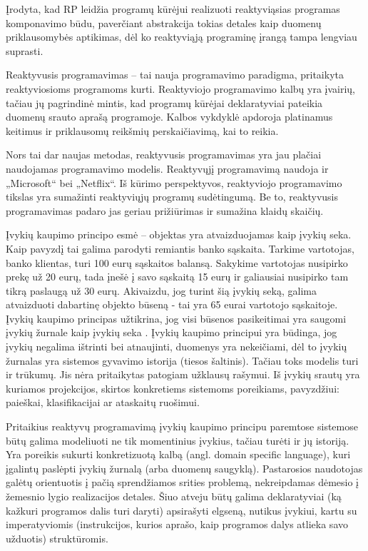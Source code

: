 Įrodyta, kad RP leidžia programų kūrėjui realizuoti reaktyviąsias programas komponavimo būdu, paverčiant abstrakcija tokias detales kaip duomenų priklausomybės aptikimas, dėl ko reaktyviąją programinę įrangą tampa lengviau suprasti.

Reaktyvusis programavimas – tai nauja programavimo paradigma, pritaikyta reaktyviosioms programoms kurti. Reaktyviojo programavimo kalbų yra įvairių, tačiau jų pagrindinė mintis, kad programų kūrėjai deklaratyviai pateikia duomenų srauto aprašą programoje. Kalbos vykdyklė apdoroja platinamus keitimus ir priklausomų reikšmių perskaičiavimą, kai to reikia.

Nors tai dar naujas metodas, reaktyvusis programavimas yra jau plačiai naudojamas programavimo modelis. Reaktyvųjį programavimą naudoja ir „Microsoft“ bei „Netflix“. Iš kūrimo perspektyvos, reaktyviojo programavimo tikslas yra sumažinti reaktyviųjų programų sudėtingumą. Be to, reaktyvusis programavimas padaro jas geriau prižiūrimas ir sumažina klaidų skaičių.

Įvykių kaupimo principo esmė – objektas yra atvaizduojamas kaip įvykių seka. Kaip pavyzdį tai galima parodyti remiantis banko sąskaita. Tarkime vartotojas, banko klientas, turi 100 eurų sąskaitos balansą. Sakykime vartotojas nusipirko prekę už 20 eurų, tada įnešė į savo sąskaitą 15 eurų ir galiausiai nusipirko tam tikrą paslaugą už 30 eurų. Akivaizdu, jog turint šią įvykių seką, galima atvaizduoti dabartinę objekto būseną - tai yra 65 eurai vartotojo sąskaitoje. Įvykių kaupimo principas užtikrina, jog visi būsenos pasikeitimai yra saugomi įvykių žurnale kaip įvykių seka \cite{vernon2013implementing}. Įvykių kaupimo principui yra būdinga, jog įvykių negalima ištrinti bei atnaujinti, duomenys yra nekeičiami, dėl to įvykių žurnalas yra sistemos gyvavimo istorija (tiesos šaltinis). Tačiau toks modelis turi ir trūkumų. Jis nėra pritaikytas patogiam užklausų rašymui. Iš įvykių srautų yra kuriamos projekcijos, skirtos konkretiems sistemoms poreikiams, pavyzdžiui: paieškai, klasifikacijai ar ataskaitų ruošimui.

Pritaikius reaktyvų programavimą įvykių kaupimo principu paremtose sistemose būtų galima modeliuoti ne tik momentinius įvykius, tačiau turėti ir jų istoriją. Yra poreikis sukurti konkretizuotą kalbą (angl. domain specific language), kuri įgalintų paslėpti įvykių žurnalą (arba duomenų saugyklą). Pastarosios naudotojas galėtų orientuotis į pačią sprendžiamos srities problemą, nekreipdamas dėmesio į žemesnio lygio realizacijos detales. Šiuo atveju būtų galima deklaratyviai (ką kažkuri programos dalis turi daryti) apsirašyti elgseną, nutikus įvykiui, kartu su imperatyviomis (instrukcijos, kurios aprašo, kaip programos dalys atlieka savo užduotis) struktūromis.


